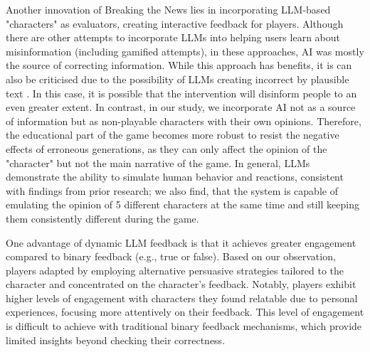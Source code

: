 Another innovation of Breaking the News lies in incorporating LLM-based "characters" as evaluators, creating interactive feedback for players. Although there are other attempts to incorporate LLMs into helping users
learn about misinformation \cite{danry2023don, hsu2024enhancing} (including gamified attempts\cite{tang2024mystery}), in these approaches, AI was mostly the source of correcting information. While this approach has benefits, it is can also be criticised due to  the possibility of LLMs creating incorrect by plausible text \cite{kim2024can,agarwal2024faithfulness}. In this case, it is possible that the intervention will disinform people to an even greater extent. In contrast, in our study, we incorporate AI not as a source of information but as non-playable characters with their own opinions. Therefore, the educational part of the game becomes more robust to resist the negative effects of erroneous generations, as they can only affect the opinion of the "character" but not the main narrative of the game. In general, LLMs demonstrate the ability to simulate human behavior and reactions, consistent with findings from prior research\cite{1park2023generative}; we also find, that the system is capable of emulating the opinion of 5 different characters at the same time and still keeping them consistently different during the game.
 
One advantage of dynamic LLM feedback is that it achieves greater engagement compared to binary feedback (e.g., true or false). Based on our observation, players adapted by employing alternative persuasive strategies tailored to the character and concentrated on the character's feedback. Notably, players exhibit higher levels of engagement with characters they found relatable due to personal experiences, focusing more attentively on their feedback. This level of engagement is difficult to achieve with traditional binary feedback mechanisms, which provide limited insights beyond checking their correctness.%

